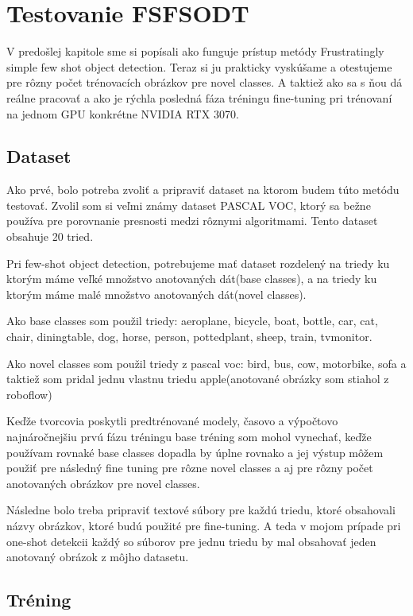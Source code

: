 \chapter{Testovanie FSFSODT}\label{chap:previous_solutions}
V predošlej kapitole sme si popísali ako funguje prístup metódy Frustratingly simple few shot object detection. Teraz si ju prakticky vyskúšame a otestujeme pre rôzny počet trénovacích obrázkov pre novel classes. A taktiež ako sa s ňou dá reálne pracovať a ako je rýchla posledná fáza tréningu fine-tuning pri trénovaní na jednom GPU konkrétne NVIDIA RTX 3070. 

\section{Dataset}
Ako prvé, bolo potreba zvoliť a pripraviť dataset na ktorom budem túto metódu testovať. Zvolil som si veľmi známy dataset PASCAL VOC, ktorý sa bežne používa pre porovnanie presnosti medzi rôznymi algoritmami. Tento dataset obsahuje 20 tried. 

Pri few-shot object detection, potrebujeme mať dataset rozdelený na triedy ku ktorým máme veľké množstvo anotovaných dát(base classes), a na triedy ku ktorým máme malé množstvo anotovaných dát(novel classes).

Ako base classes som použil triedy: aeroplane, bicycle, boat, bottle, car, cat, chair, diningtable, dog, horse, person, pottedplant, sheep, train, tvmonitor.

Ako novel classes som použil triedy z pascal voc:
bird, bus, cow, motorbike, sofa a taktiež som pridal jednu vlastnu triedu apple(anotované obrázky som stiahol z roboflow)

Keďže tvorcovia poskytli predtrénované modely, časovo a výpočtovo najnáročnejšiu prvú fázu tréningu base tréning som mohol vynechať, keďže používam rovnaké base classes dopadla by úplne rovnako a jej výstup môžem použiť pre následný fine tuning pre rôzne novel classes a aj pre rôzny počet anotovaných obrázkov pre novel classes. 

Následne bolo treba pripraviť textové súbory pre každú triedu, ktoré obsahovali názvy obrázkov, ktoré budú použité pre fine-tuning. A teda v mojom prípade pri one-shot detekcii každý so súborov pre jednu triedu by mal obsahovať jeden anotovaný obrázok z môjho datasetu. 

\section{Tréning}

